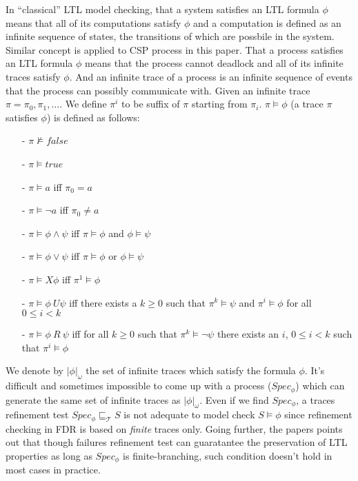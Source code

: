 \documentclass{llncs}
\newcommand{\csptracesmodel}{\mathcal{T}}
\begin{document}
In ``classical'' LTL model checking, that a system satisfies an LTL formula $\phi$ 
means that all of its computations satisfy $\phi$ and a computation is defined as an
infinite sequence
of states, the transitions of which are possbile in the system. Similar concept is applied to
CSP process in this paper. That a process satisfies an LTL formula $\phi$ means that
the process cannot deadlock and all of its infinite traces satisfy $\phi$. 
And an infinite trace of a process is an infinite sequence of events that
the process can possibly communicate with. Given an infinite trace $\pi =
\pi_0,\pi_1,\dots$. We define $\pi^i$ to be suffix of $\pi$ starting from
$\pi_i$. $\pi \models \phi$ (a trace $\pi$ satisfies $\phi$) is
defined as follows:
\begin{itemize}
\item[-] $\pi \not\models false$
\item[-] $\pi \models true$
\item[-] $\pi \models a$ iff $\pi_0 = a$
\item[-] $\pi \models \neg a$ iff $\pi_0 \neq a$
\item[-] $\pi \models \phi \land \psi$ iff $\pi \models \phi$ and $\phi \models \psi$
\item[-] $\pi \models \phi \lor \psi$ iff $\pi \models \phi$ or $\phi \models \psi$
\item[-] $\pi \models X\phi$ iff $\pi^1 \models \phi$
\item[-] $\pi \models \phi\ U \psi$ iff there exists a $k \geq 0$ such that
$\pi^k \models \psi$ and $\pi^i \models \phi$ for all $0 \leq i < k$
\item[-] $\pi \models \phi\ R\ \psi$ iff for all $k \geq 0$ such that $\pi^k
\models \neg \psi$ there exists an $i$, $0 \leq i < k$ such that $\pi^i \models \phi$
\end{itemize}

We denote by $|\phi|_\omega$ the set of infinite traces which satisfy the
formula $\phi$. It's difficult and sometimes impossible to come up with a
process ($Spec_\phi$) which can generate the same set of infinite traces
 as $|\phi|_\omega$. Even if we find
$Spec_\phi$, a traces refinement test $Spec_\phi \sqsubseteq_\csptracesmodel S$
is not adequate to model check $S \models \phi$ since refinement checking in FDR is based
on \emph{finite} traces only. Going further, the papers points out that though failures
refinement test can guaratantee the preservation of LTL properties as long as
$Spec_\phi$ is finite-branching, such condition doesn't hold in most cases
in practice.
\end{document}
